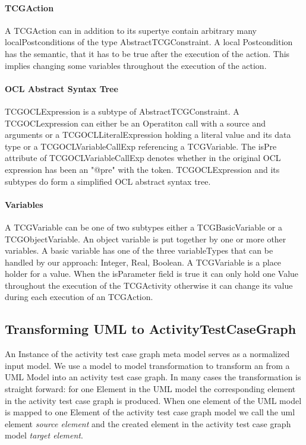 \paragraph{TCGAction} A TCGAction can in addition to its supertye contain arbitrary many localPostconditions of the type AbstractTCGConstraint. A local Postcondition has the semantic, that it has to be true after the execution of the action. This implies changing some variables throughout the execution of the action.
\paragraph{OCL Abstract Syntax Tree}

TCGOCLExpression is a subtype of AbstractTCGConstraint. A TCGOCLexpression can either be an Operatiton call with a source and  arguments or a TCGOCLLiteralExpression holding a literal value and its data type or a TCGOCLVariableCallExp referencing a TCGVariable. The isPre attribute of TCGOCLVariableCallExp denotes whether in the original OCL expression has been an "@pre" with the token. TCGOCLExpression and its subtypes do form a simplified OCL abstract syntax tree.
\paragraph{Variables}
A TCGVariable can be one of two subtypes either a TCGBasicVariable or a TCGObjectVariable. An object variable is put together by one or more other variables. A basic variable has one of the three variableTypes that can be handled by our approach: Integer, Real, Boolean. A TCGVariable is a place holder for a value. When the isParameter field is true it can only hold one Value throughout the execution of the TCGActivity otherwise it can change its value during each execution of an TCGAction.

\subsection{Transforming UML to ActivityTestCaseGraph}
An Instance of the activity test case graph meta model serves as a normalized input model. We use a model to model transformation to transform an  from a UML Model into an activity test case graph. In many cases the transformation is straight forward: for one Element in the UML model the corresponding element in the activity test case graph is produced. When one element of the UML model is mapped to one Element of the activity test case graph model we call the uml element \emph{source element} and the created element in the activity test case graph model \emph{target element}.
